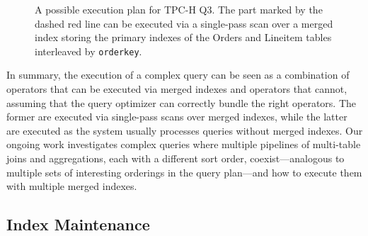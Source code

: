\documentclass[sigconf, pdfa, nonacm]{acmart}
\begin{document}
\begin{figure}[htbp]
{
    }
    \caption{A possible execution plan for TPC-H Q3. \textnormal{
        The part marked by the dashed red line can be executed via a single-pass scan over a merged index storing the primary indexes of the Orders and Lineitem tables interleaved by \texttt{orderkey}.
    }}\label{fig:tpch_q3_plan}
\end{figure}

In summary, the execution of a complex query can be seen as a combination of operators that can be executed via merged indexes and operators that cannot, assuming that the query optimizer can correctly bundle the right operators.
The former are executed via single-pass scans over merged indexes, while the latter are executed as the system usually processes queries without merged indexes.
Our ongoing work investigates complex queries where multiple pipelines of multi-table joins and aggregations, each with a different sort order, coexist---analogous to multiple sets of interesting orderings in the query plan---and how to execute them with multiple merged indexes.

\subsection{Index Maintenance}\label{subsec:maintenance} 
\end{document}

